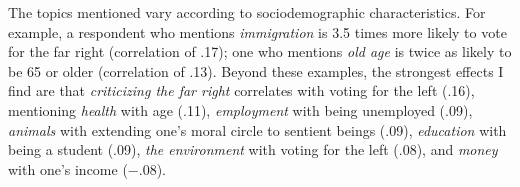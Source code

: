 \documentclass[12pt,english]{article}
\begin{document}
The topics mentioned vary according to sociodemographic characteristics. For example, a respondent who mentions \textit{immigration} is 3.5 times more likely to vote for the far right (correlation of .17); one who mentions \textit{old age} is twice as likely to be 65 or older (correlation of .13). Beyond these examples, the strongest effects I find are that \textit{criticizing the far right} correlates with voting for the left (.16), mentioning \textit{health} with age (.11), \textit{employment} with being unemployed (.09), \textit{animals} with extending one's moral circle to sentient beings (.09), \textit{education} with being a student (.09), \textit{the environment} with voting for the left (.08), and \textit{money} with one's income ($-$.08).
\end{document}
